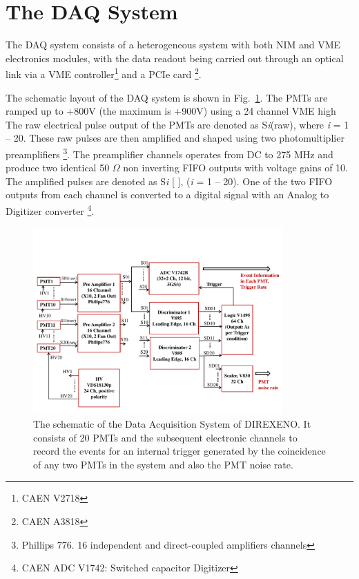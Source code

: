 \section{The DAQ System }
\label{sec:DAQ}


The DAQ system consists of a heterogeneous system with both 
NIM and VME electronics modules, with the data readout being carried out 
through an optical link via a VME controller\footnote{CAEN V2718} and a 
PCIe card \footnote{CAEN A3818}. 

The schematic layout of the DAQ system is shown in Fig.~{\ref{Fig:DAQscheme}}. 
The PMTs are ramped up to +800V (the maximum is +900V) using a 24 channel VME high 
The raw electrical pulse output of the PMTs are denoted as S{\it i}(raw), where {\it i} = 1 -- 20. 
These raw pulses are then amplified and shaped using two photomultiplier preamplifiers 
\footnote{Phillips 776. 16 independent and direct-coupled amplifiers channels}. 
The preamplifier channels operates from DC to 275 MHz and produce two identical 
50 $\Omega$ non inverting FIFO outputs with voltage gains of 10. 
The amplified pulses are denoted as S{\it i} 
[ ], 
({\it i} = 1 -- 20). One of the two FIFO outputs from each channel is converted to a 
digital signal with an Analog to Digitizer converter \footnote{CAEN ADC V1742: Switched capacitor Digitizer}. 

\begin{figure}[h]
   \centering
   \includegraphics[width=0.85\textwidth]{DAQscheme.pdf}
   \caption{The schematic of the Data Acquisition System of DIREXENO. It 
        consists of 20 PMTs and the subsequent electronic channels to record 
        the events for an internal trigger generated by the coincidence of any 
        two PMTs in the system and also the PMT noise rate.}
   \label{Fig:DAQscheme}
\end{figure}

